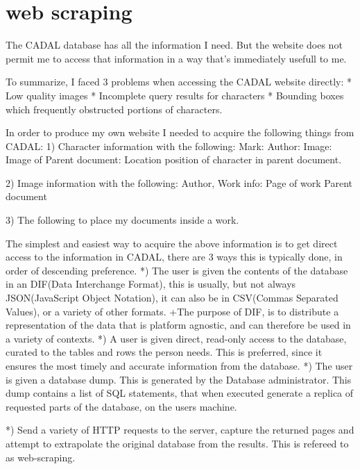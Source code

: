 \chapter{web scraping}

The CADAL database has all the information I need.  But the website does not permit me to access that information in a way that's immediately usefull to me.

    To summarize, I faced 3 problems when accessing the CADAL website directly:
        *  Low quality images
        *  Incomplete query results for characters
        *  Bounding boxes which frequently obstructed portions of characters.
                   



    In order to produce my own website I needed to acquire the following things from CADAL:
        1)  Character information with the following:
            Mark:
            Author:
            Image:
            Image of Parent document:
            Location position of character in parent document.
        
        2)  Image information with the following:
            Author,
            Work info:
                Page of work
                Parent document
            
        3)    The following to place my documents inside a work.
                
            The simplest and easiest way to acquire the above information is to get direct access to the information in CADAL, there are 3 ways this is typically done, in order of descending preference.
            *)  The user is given the contents of the database in an DIF(Data Interchange Format), this is usually, but not always JSON(JavaScript Object Notation), it can also be in CSV(Commas Separated Values), or a variety of other formats.
                +The purpose of DIF, is to distribute a representation of the data that is platform agnostic, and can  therefore be used in a variety of contexts.
            *)  A user is given direct, read-only access to the database, curated to the tables and rows the person needs.  This is preferred, since it ensures the most timely and accurate information from the database.
            *)  The user is given a database dump.  This is generated by the Database administrator.  This dump contains a list of SQL statements, that when executed generate a replica of requested parts of the database, on the users machine.

            *)  Send a variety of HTTP requests to the server, capture the returned pages and attempt to extrapolate the original database from the results.  This is refereed to as web-scraping.
            
